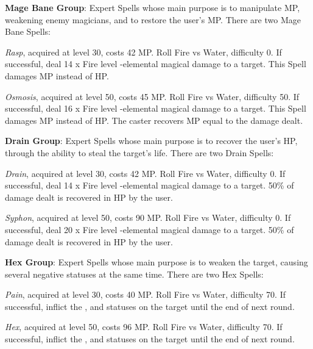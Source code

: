 \begin{multicols}{2}
    \textbf{Mage Bane Group}: Expert Spells whose main purpose is to manipulate MP, weakening enemy magicians, and to restore the user's MP\@. There are two Mage Bane Spells:
    
    \textit{Rasp}, acquired at level 30, costs 42 MP\@. Roll Fire vs Water, difficulty 0. If successful, deal 14 x Fire level -elemental magical damage to a target. This Spell damages MP instead of HP\@. 
    
    \textit{Osmosis}, acquired at level 50, costs 45 MP\@. Roll Fire vs Water, difficulty 50. If successful, deal 16 x Fire level -elemental magical damage to a target. This Spell damages MP instead of HP\@. The caster recovers MP equal to the damage dealt.

    \ffcrystal[type=level,height=8pt]

    \textbf{Drain Group}: Expert Spells whose main purpose is to recover the user's HP, through the ability to steal the target’s life. There are two Drain Spells:
    
    \textit{Drain}, acquired at level 30, costs 42 MP\@. Roll Fire vs Water, difficulty 0. If successful, deal 14 x Fire level -elemental magical damage to a target. 50\% of damage dealt is recovered in HP by the user.
    
    \textit{Syphon}, acquired at level 50, costs 90 MP\@. Roll Fire vs Water, difficulty 0. If successful, deal 20 x Fire level -elemental magical damage to a target. 50\% of damage dealt is recovered in HP by the user.

    \ffcrystal[type=level,height=8pt]

    \textbf{Hex Group}: Expert Spells whose main purpose is to weaken the target, causing several negative statuses at the same time. There are two Hex Spells:
    
    \textit{Pain}, acquired at level 30, costs 40 MP\@. Roll Fire vs Water, difficulty 70. If successful, inflict the ,  and  statuses on the target until the end of next round.
    
    \textit{Hex}, acquired at level 50, costs 96 MP\@. Roll Fire vs Water, difficulty 70. If successful, inflict the ,  and  statuses on the target until the end of next round.


\end{multicols}
